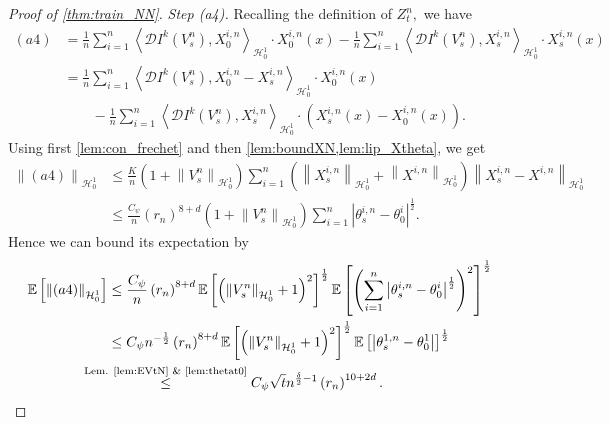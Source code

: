 \documentclass[11pt,a4paper,reqno]{amsart}
\numberwithin{equation}{section}
\theoremstyle{plain}
\theoremstyle{definition}
\newcommand{\ip}[1]{\left\langle#1\right\rangle}
\newcommand{\E}{\mathbb{E}}
\newcommand{\cH}{\mathcal{H}}
\newcommand{\norm}[1]{\left\|#1 \right\|} %
\newcommand{\abs}[1]{\left|#1\right|} %
\begin{document}
\begin{proof}[Proof of \cref{thm:train_NN}]
\noindent \textit{Step (a4).}
Recalling the definition of $Z_t^n,$ we have
\begin{align*}
\left(a4\right) 
    &= \frac{1}{n}\sum_{i=1}^n \ip{\mathcal{D}I^k \left( V^n_s \right), X^{i,n}_0 }_{\cH_0^1}\cdot X^{i,n}_0 (x) - \frac{1}{n}\sum_{i=1}^n \ip{\mathcal{D}I^k \left( V^n_s \right), X_s^{i,n} }_{\cH_0^1}\cdot X_s^{i,n} (x) \\
    &= \frac{1}{n}\sum_{i=1}^n \ip{\mathcal{D}I^k \left( V^n_s \right), X^{i,n}_0 - X_s^{i,n}}_{\cH_0^1}\cdot X^{i,n}_0 \left(x\right) \\
    &\qquad - \frac{1}{n} \sum_{i=1}^n \ip{\mathcal{D}I^k \left( V^n_s \right), X_s^{i,n}}_{\cH_0^1} \cdot \left(X_s^{i,n}\left(x\right) - X^{i,n}_0 \left(x\right) \right).
\end{align*}
Using first \cref{lem:con_frechet} and then \cref{lem:boundXN,lem:lip_Xtheta}, we get
\begin{align*}
\norm{\left(a4\right)}_{\cH_0^1} 
    &\le \frac{K}{n} \left( 1 + \norm{V_s^n}_{\cH_0^1} \right)\sum_{i=1}^n \left( \norm{X_s^{i,n}}_{\cH_0^1} + \norm{X^{i,n}}_{\cH_0^1} \right) \norm{X_s^{i,n} - X^{i,n}}_{\cH_0^1} \\
   &\le \frac{C_\psi}{n} \left(r_n\right)^{8 + d} \left( 1 + \norm{V_s^n}_{\cH_0^1} \right) \sum_{i=1}^n \abs{\theta_s^{i,n} - \theta_0^i}^{\frac{1}{2}}.
\end{align*}
Hence we can bound its expectation by
\begin{align*}
\E \left[ \norm{\left(a4\right)}_{\cH_0^1} \right] 
    &\le \frac{C_\psi}{n} \left(r_n\right)^{8 + d} \E \left[ \left( \norm{V_s^n}_{\cH_0^1}+1 \right)^2 \right]^{\frac{1}{2}} \E \left[ \left( \sum_{i=1}^n \abs{\theta_s^{i,n} - \theta_0^i}^{\frac{1}{2}} \right)^2 \right]^{\frac{1}{2}} \\
    &\le C_\psi n^{-\frac{1}{2}}\left(r_n\right)^{8 + d} \E \left[ \left( \norm{V_s^n}_{\cH_0^1}+1 \right)^2 \right]^{\frac{1}{2}} \E \left[ \abs{\theta_s^{1,n} - \theta_0^1} \right]^{\frac{1}{2}} \\
    &\hspace{-1.95em}\overset{\text{Lem. \ref{lem:EVtN} \& \ref{lem:thetat0}}}{\le}  C_\psi \sqrt{t}n^{\frac{\delta}{2}-1}\left(r_n\right)^{10 + 2d} .
\end{align*}


\end{proof}
\end{document}
